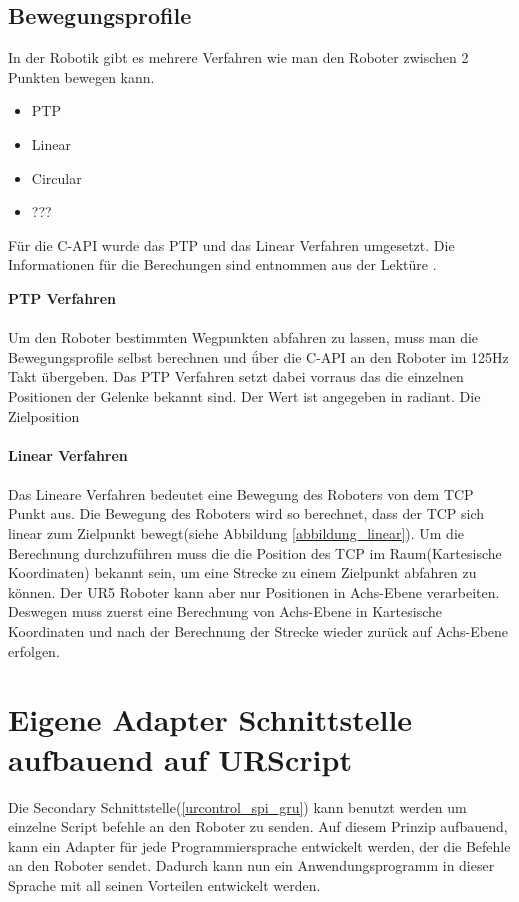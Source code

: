 \subsection{Bewegungsprofile}
\label{sub:bewegungsprofile_gru}

In der Robotik gibt es mehrere Verfahren wie man den Roboter zwischen 2 Punkten bewegen kann. 

\begin{itemize}
\item \acf{PTP}
\item Linear
\item Circular
\item ???
\end{itemize}

Für die C-\ac{API} wurde das \ac{PTP} und das Linear Verfahren umgesetzt. Die Informationen für die Berechungen sind entnommen aus der Lektüre \cite{WW-2013}.

\textbf{\acs{PTP} Verfahren}
\\\\
Um den Roboter bestimmten Wegpunkten abfahren zu lassen, muss man die Bewegungsprofile selbst berechnen und ǘber die C-API an den Roboter im 125Hz Takt übergeben. Das \ac{PTP} Verfahren setzt dabei vorraus das die einzelnen Positionen der Gelenke bekannt sind. Der Wert ist angegeben in radiant. Die Zielposition
\\\\
\textbf{Linear Verfahren}
\\\\
Das Lineare Verfahren bedeutet eine Bewegung des Roboters von dem \ac{TCP} Punkt aus. Die Bewegung des Roboters wird so berechnet, dass der \acs{TCP} sich linear zum Zielpunkt bewegt(siehe Abbildung \ref{abbildung_linear}).
Um die Berechnung durchzuführen muss die die Position des \acs{TCP} im Raum(Kartesische Koordinaten) bekannt sein, um eine Strecke zu einem Zielpunkt abfahren zu können. Der UR5 Roboter kann aber nur Positionen in Achs-Ebene verarbeiten. Deswegen muss zuerst eine Berechnung von Achs-Ebene in Kartesische Koordinaten und nach der Berechnung der Strecke wieder zurück auf Achs-Ebene erfolgen.

\section{Eigene Adapter Schnittstelle aufbauend auf URScript}
\label{sec:urscript_adapter}

Die Secondary Schnittstelle(\ref{urcontrol_spi_gru}) kann benutzt werden um einzelne Script befehle an den Roboter zu senden. Auf diesem Prinzip aufbauend, kann ein Adapter für jede Programmiersprache entwickelt werden, der die Befehle an den Roboter sendet. Dadurch kann nun ein Anwendungsprogramm in dieser Sprache mit all seinen Vorteilen entwickelt werden.

